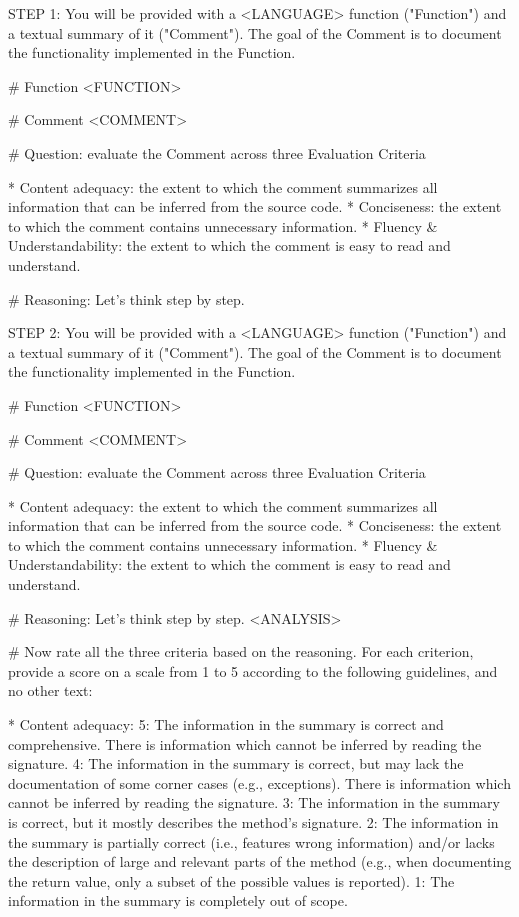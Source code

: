 STEP 1:
You will be provided with a <LANGUAGE> function ("Function") and a textual summary of it ("Comment"). The goal of the Comment is to document the functionality implemented in the Function.

# Function
<FUNCTION>

# Comment
<COMMENT>

# Question: evaluate the Comment across three Evaluation Criteria

* Content adequacy: the extent to which the comment summarizes all information that can be inferred from the source code.
* Conciseness: the extent to which the comment contains unnecessary information.
* Fluency & Understandability: the extent to which the comment is easy to read and understand.

# Reasoning: Let's think step by step.

STEP 2:
You will be provided with a <LANGUAGE> function ("Function") and a textual summary of it ("Comment"). The goal of the Comment is to document the functionality implemented in the Function.

# Function
<FUNCTION>

# Comment
<COMMENT>

# Question: evaluate the Comment across three Evaluation Criteria

* Content adequacy: the extent to which the comment summarizes all information that can be inferred from the source code.
* Conciseness: the extent to which the comment contains unnecessary information.
* Fluency & Understandability: the extent to which the comment is easy to read and understand.

# Reasoning: Let's think step by step.
<ANALYSIS>

# Now rate all the three criteria based on the reasoning. For each criterion, provide a score on a scale from 1 to 5 according to the following guidelines, and no other text:

* Content adequacy:
	5: The information in the summary is correct and comprehensive. There is information which cannot be inferred by reading the signature.
	4: The information in the summary is correct, but may lack the documentation of some corner cases (e.g., exceptions). There is information which cannot be inferred by reading the signature.
	3: The information in the summary is correct, but it mostly describes the method's signature.
	2: The information in the summary is partially correct (i.e., features wrong information) and/or lacks the description of large and relevant parts of the method (e.g., when documenting the return value, only a subset of the possible values is reported).
	1: The information in the summary is completely out of scope.
	
